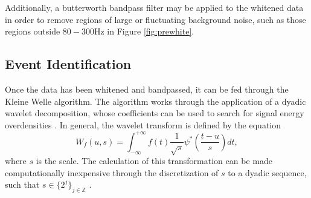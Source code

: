 \documentclass{article}
\begin{document}
Additionally, a butterworth bandpass filter may be applied to the whitened data \cite{Blackburn2007}\cite{LIGOScientificCollaboration} in order to remove regions of large or fluctuating background noise, such as those regions outside $80-300\mathrm{Hz}$ in Figure \ref{fig:prewhite}.

\subsection{Event Identification}
Once the data has been whitened and bandpassed, it can be fed through the Kleine Welle algorithm. The algorithm works through the application of a dyadic wavelet decomposition, whose coefficients can be used to search for signal energy overdensities \cite{Biswas2013}\cite{Blackburn2007}. In general, the wavelet transform is defined by the equation \cite{Blackburn2007}\cite{Mallat1999}
\begin{equation}
W_{f}(u,s)=\int_{-\infty}^{+\infty}f(t)\frac{1}{\sqrt{s}}\psi^{*}\left(\frac{t-u}{s}\right)dt, \label{eq:wavtr}
\end{equation}
where $s$ is the scale. The calculation of this transformation can be made computationally inexpensive through the discretization of $s$ to a dyadic sequence, such that $s \in \{2^{j}\}_{j\in\mathbb{Z}}$ \cite{Blackburn2007}\cite{Mallat1999}.
\end{document}
